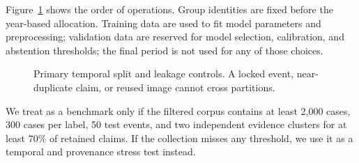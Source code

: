 Figure~\ref{fig:temporal-protocol} shows the order of operations. Group identities are fixed before the year-based allocation. Training data are used to fit model parameters and preprocessing; validation data are reserved for model selection, calibration, and abstention thresholds; the final period is not used for any of those choices.

\begin{figure}[t]
\centering
\resizebox{\columnwidth}{!}{}
\caption{Primary temporal split and leakage controls. A locked event, near-duplicate claim, or reused image cannot cross partitions.}
\label{fig:temporal-protocol}
\end{figure}

We treat \datasetname{} as a benchmark only if the filtered corpus contains at least 2,000 cases, 300 cases per label, 50 test events, and two independent evidence clusters for at least 70\% of retained claims. If the collection misses any threshold, we use it as a temporal and provenance stress test instead.

